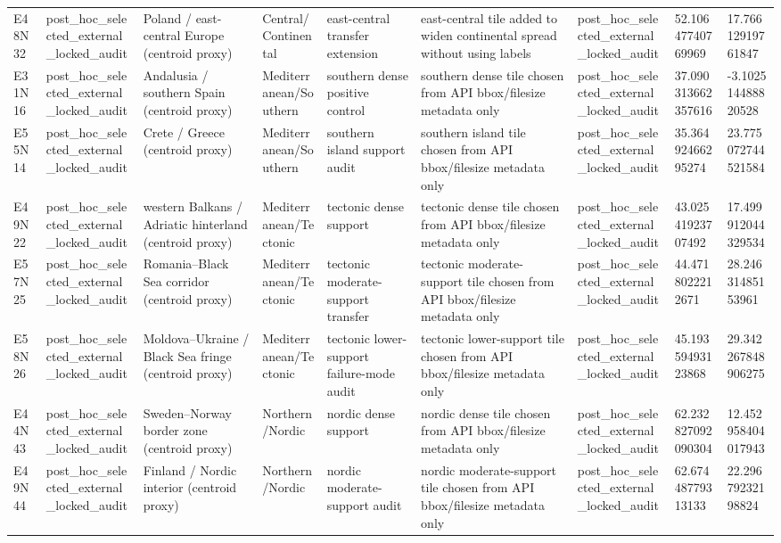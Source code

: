 \begin{landscape}
\begin{longtable}{lllllllll}
E48N32 & post\_hoc\_selected\_external\_locked\_audit & Poland / east-central Europe (centroid proxy) & Central/Continental & east-central transfer extension & east-central tile added to widen continental spread without using labels & post\_hoc\_selected\_external\_locked\_audit & 52.10647740769969 & 17.76612919761847 \\
E31N16 & post\_hoc\_selected\_external\_locked\_audit & Andalusia / southern Spain (centroid proxy) & Mediterranean/Southern & southern dense positive control & southern dense tile chosen from API bbox/filesize metadata only & post\_hoc\_selected\_external\_locked\_audit & 37.090313662357616 & -3.102514488820528 \\
E55N14 & post\_hoc\_selected\_external\_locked\_audit & Crete / Greece (centroid proxy) & Mediterranean/Southern & southern island support audit & southern island tile chosen from API bbox/filesize metadata only & post\_hoc\_selected\_external\_locked\_audit & 35.36492466295274 & 23.775072744521584 \\
E49N22 & post\_hoc\_selected\_external\_locked\_audit & western Balkans / Adriatic hinterland (centroid proxy) & Mediterranean/Tectonic & tectonic dense support & tectonic dense tile chosen from API bbox/filesize metadata only & post\_hoc\_selected\_external\_locked\_audit & 43.02541923707492 & 17.499912044329534 \\
E57N25 & post\_hoc\_selected\_external\_locked\_audit & Romania–Black Sea corridor (centroid proxy) & Mediterranean/Tectonic & tectonic moderate-support transfer & tectonic moderate-support tile chosen from API bbox/filesize metadata only & post\_hoc\_selected\_external\_locked\_audit & 44.4718022212671 & 28.24631485153961 \\
E58N26 & post\_hoc\_selected\_external\_locked\_audit & Moldova–Ukraine / Black Sea fringe (centroid proxy) & Mediterranean/Tectonic & tectonic lower-support failure-mode audit & tectonic lower-support tile chosen from API bbox/filesize metadata only & post\_hoc\_selected\_external\_locked\_audit & 45.19359493123868 & 29.342267848906275 \\
E44N43 & post\_hoc\_selected\_external\_locked\_audit & Sweden–Norway border zone (centroid proxy) & Northern/Nordic & nordic dense support & nordic dense tile chosen from API bbox/filesize metadata only & post\_hoc\_selected\_external\_locked\_audit & 62.232827092090304 & 12.452958404017943 \\
E49N44 & post\_hoc\_selected\_external\_locked\_audit & Finland / Nordic interior (centroid proxy) & Northern/Nordic & nordic moderate-support audit & nordic moderate-support tile chosen from API bbox/filesize metadata only & post\_hoc\_selected\_external\_locked\_audit & 62.67448779313133 & 22.29679232198824 \\

\end{longtable}
\end{landscape}
